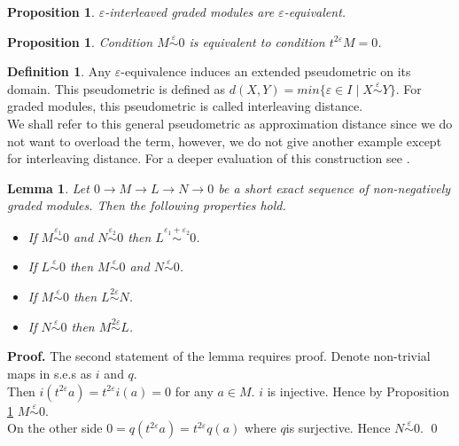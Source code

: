 \documentclass[english,12pt]{article}
\newcounter{stmcounter}[section]
\numberwithin{equation}{section}
\newtheorem{proposition}[stmcounter]{Proposition}
\newtheorem{lemma}[stmcounter]{Lemma}
\theoremstyle{definition}
\newtheorem{definition}[stmcounter]{Definition}
\theoremstyle{remark}
\newenvironment{pf}{\noindent\textbf{Proof.}}{\qed}
\begin{document}
\begin{proposition}
  $\varepsilon$-interleaved graded modules are $\varepsilon$-equivalent.
\end{proposition}

\begin{proposition} {\cite[Proposition 2.13]{GS16}}
  \label{epstriv}
  Condition $M \stackrel{\varepsilon}{\sim} 0$ is equivalent to condition $t^{2\varepsilon}M = 0$.
\end{proposition}

\begin{definition}
  Any $\varepsilon$-equivalence induces an extended pseudometric on its domain. This pseudometric is defined as $d(X,Y) = min\{\varepsilon \in I\;|\;X \stackrel{\varepsilon}{\sim} Y\}$. For graded modules, this pseudometric is called interleaving distance. {\cite[Definition 2.12]{GS16}}\\
  We shall refer to this general pseudometric as approximation distance since we do not want to overload the term, however, we do not give another example except for interleaving distance. For a deeper evaluation of this construction see {\cite{deSilva18}}.
\end{definition}

\begin{lemma}
  \label{ops}
  Let $0 \to M \to L \to N \to 0$ be a short exact sequence of non-negatively graded modules. Then the following properties hold.
  \begin{itemize}
    \item If $M \stackrel{\varepsilon_1}{\sim} 0$ and $N \stackrel{\varepsilon_2}{\sim} 0$ then $L \stackrel{\varepsilon_1 + \varepsilon_2}{\sim} 0$. {\cite[Proposition 4.6]{GS16}}
    \item If $L \stackrel{\varepsilon}{\sim} 0$ then $M \stackrel{\varepsilon}{\sim} 0$ and $N \stackrel{\varepsilon}{\sim} 0$.
    \item If $M \stackrel{\varepsilon}{\sim} 0$ then $L \stackrel{2\varepsilon}{\sim} N$. {\cite[Proposition 4.1]{GS16}}
    \item If $N \stackrel{\varepsilon}{\sim} 0$ then $M \stackrel{2\varepsilon}{\sim} L$. {\cite[Proposition 4.1]{GS16}}
  \end{itemize}
\end{lemma}

\begin{pf}
  The second statement of the lemma requires proof. Denote non-trivial maps in s.e.s as $i$ and $q$.\\

  Then $i(t^{2\varepsilon}a) = t^{2\varepsilon}i(a) = 0$ for any $a \in M$. $i$ is injective. Hence by Proposition \ref{epstriv} $M \stackrel{\varepsilon}{\sim} 0$.\\

  On the other side $0 = q(t^{2\varepsilon}a) = t^{2\varepsilon}q(a)$ where $q$is surjective. Hence $N \stackrel{\varepsilon}{\sim} 0$.
\end{pf}
\end{document}
